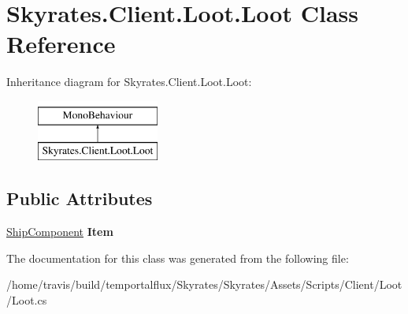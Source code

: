 \hypertarget{class_skyrates_1_1_client_1_1_loot_1_1_loot}{\section{Skyrates.\-Client.\-Loot.\-Loot Class Reference}
\label{class_skyrates_1_1_client_1_1_loot_1_1_loot}
}
Inheritance diagram for Skyrates.\-Client.\-Loot.\-Loot\-:\begin{figure}[H]
\begin{center}
\leavevmode
\includegraphics[height=2.000000cm]{class_skyrates_1_1_client_1_1_loot_1_1_loot}
\end{center}
\end{figure}
\subsection*{Public Attributes}
\begin{DoxyCompactItemize}
\item 
\hypertarget{class_skyrates_1_1_client_1_1_loot_1_1_loot_a295eba520dd781c17f67c70799aa2322}{\hyperlink{class_skyrates_1_1_client_1_1_ship_1_1_ship_component}{Ship\-Component} {\bfseries Item}}\label{class_skyrates_1_1_client_1_1_loot_1_1_loot_a295eba520dd781c17f67c70799aa2322}

\end{DoxyCompactItemize}


The documentation for this class was generated from the following file\-:\begin{DoxyCompactItemize}
\item 
/home/travis/build/temportalflux/\-Skyrates/\-Skyrates/\-Assets/\-Scripts/\-Client/\-Loot/Loot.\-cs\end{DoxyCompactItemize}
